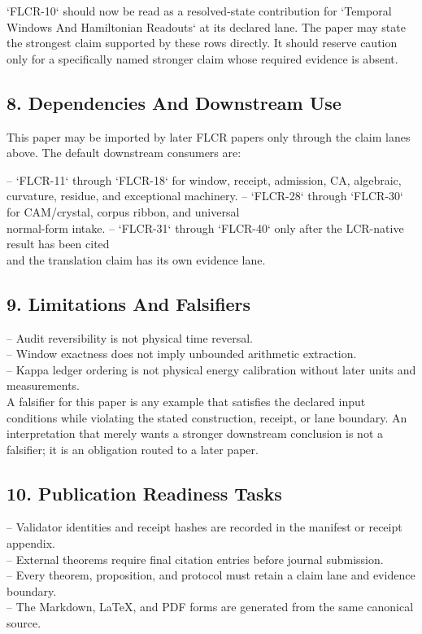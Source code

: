 \documentclass[11pt]{article}
\begin{document}
`FLCR-10` should now be read as a resolved-state contribution for `Temporal Windows And Hamiltonian Readouts` at its declared lane. The paper may state the strongest claim supported by these rows directly. It should reserve caution only for a specifically named stronger claim whose required evidence is absent.

\subsection*{8. Dependencies And Downstream Use}

This paper may be imported by later FLCR papers only through the claim lanes
above. The default downstream consumers are:

\noindent{}-- `FLCR-11` through `FLCR-18` for window, receipt, admission, CA, algebraic,\\
  curvature, residue, and exceptional machinery.
\noindent{}-- `FLCR-28` through `FLCR-30` for CAM/crystal, corpus ribbon, and universal\\
  normal-form intake.
\noindent{}-- `FLCR-31` through `FLCR-40` only after the LCR-native result has been cited\\
  and the translation claim has its own evidence lane.

\subsection*{9. Limitations And Falsifiers}

\noindent{}-- Audit reversibility is not physical time reversal.\\
\noindent{}-- Window exactness does not imply unbounded arithmetic extraction.\\
\noindent{}-- Kappa ledger ordering is not physical energy calibration without later units and measurements.\\

A falsifier for this paper is any example that satisfies the declared input
conditions while violating the stated construction, receipt, or lane boundary.
An interpretation that merely wants a stronger downstream conclusion is not a
falsifier; it is an obligation routed to a later paper.

\subsection*{10. Publication Readiness Tasks}

\noindent{}-- Validator identities and receipt hashes are recorded in the manifest or receipt appendix.\\
\noindent{}-- External theorems require final citation entries before journal submission.\\
\noindent{}-- Every theorem, proposition, and protocol must retain a claim lane and evidence boundary.\\
\noindent{}-- The Markdown, LaTeX, and PDF forms are generated from the same canonical source.\\
\end{document}
